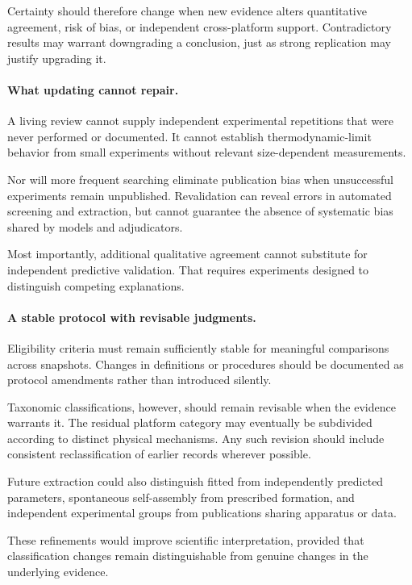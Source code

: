 Certainty should therefore change when
new evidence alters quantitative agreement,
risk of bias, or independent cross-platform
support. Contradictory results may warrant
downgrading a conclusion, just as strong
replication may justify upgrading it.

\paragraph*{What updating cannot repair.}

A living review cannot supply independent
experimental repetitions that were never
performed or documented. It cannot establish
thermodynamic-limit behavior from small
experiments without relevant size-dependent
measurements.

Nor will more frequent searching eliminate
publication bias when unsuccessful experiments
remain unpublished. Revalidation can reveal
errors in automated screening and extraction,
but cannot guarantee the absence of systematic
bias shared by models and adjudicators.

Most importantly, additional qualitative
agreement cannot substitute for independent
predictive validation. That requires experiments
designed to distinguish competing explanations.

\paragraph*{A stable protocol with revisable judgments.}

Eligibility criteria must remain sufficiently
stable for meaningful comparisons across
snapshots. Changes in definitions or
procedures should be documented as protocol
amendments rather than introduced silently.

Taxonomic classifications, however, should
remain revisable when the evidence warrants it.
The residual platform category may eventually
be subdivided according to distinct physical
mechanisms. Any such revision should include
consistent reclassification of earlier
records wherever possible.

Future extraction could also distinguish
fitted from independently predicted parameters,
spontaneous self-assembly from prescribed
formation, and independent experimental groups
from publications sharing apparatus or data.

These refinements would improve scientific
interpretation, provided that classification
changes remain distinguishable from genuine
changes in the underlying evidence.

